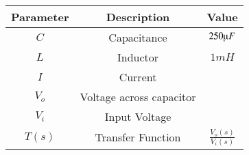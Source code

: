 \begin{tabular}{|c|c|c|}
\hline
    \textbf{Parameter} & \textbf{Description} & \textbf{Value} \\
    \hline
    $C$ & Capacitance & $250\micro F$\\
    \hline
    $L$ & Inductor & $1mH$\\
    \hline
    $I$ & Current &  \\
    \hline
    $V_o$ & Voltage across capacitor & \\
    \hline 
    $V_i$ & Input Voltage & \\
    \hline 
    $T(s)$ & Transfer Function & $\frac{V_o(s)}{V_i(s)}$\\
    \hline
    \end{tabular}
